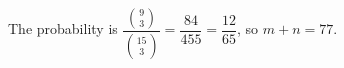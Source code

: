 The probability is $\dfrac{\binom93}{\binom{15}3}=\dfrac{84}{455}=\dfrac{12}{65}$, so $\boxed{m+n=77}$.
